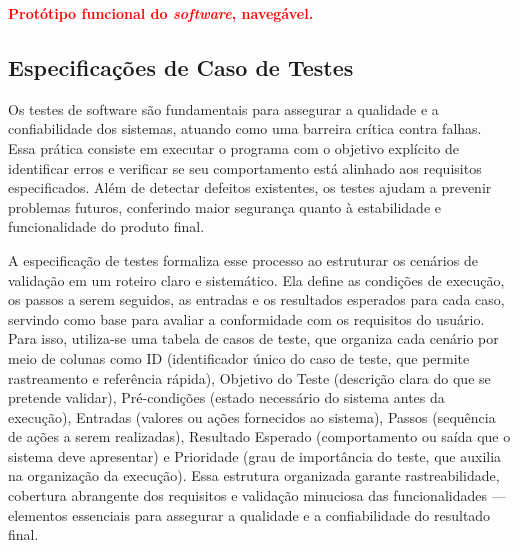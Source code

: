 \textcolor{red}{ \textbf{Protótipo funcional do \textit{software}, navegável.}}

\subsection{Especificações de Caso de Testes}

Os testes de software são fundamentais para assegurar a qualidade e a confiabilidade dos sistemas, atuando como uma barreira crítica contra falhas. Essa prática consiste em executar o programa com o objetivo explícito de identificar erros e verificar se seu comportamento está alinhado aos requisitos especificados. Além de detectar defeitos existentes, os testes ajudam a prevenir problemas futuros, conferindo maior segurança quanto à estabilidade e funcionalidade do produto final.

A especificação de testes formaliza esse processo ao estruturar os cenários de validação em um roteiro claro e sistemático. Ela define as condições de execução, os passos a serem seguidos, as entradas e os resultados esperados para cada caso, servindo como base para avaliar a conformidade com os requisitos do usuário. Para isso, utiliza-se uma tabela de casos de teste, que organiza cada cenário por meio de colunas como ID (identificador único do caso de teste, que permite rastreamento e referência rápida), Objetivo do Teste (descrição clara do que se pretende validar), Pré-condições (estado necessário do sistema antes da execução), Entradas (valores ou ações fornecidos ao sistema), Passos (sequência de ações a serem realizadas), Resultado Esperado (comportamento ou saída que o sistema deve apresentar) e Prioridade (grau de importância do teste, que auxilia na organização da execução). Essa estrutura organizada garante rastreabilidade, cobertura abrangente dos requisitos e validação minuciosa das funcionalidades — elementos essenciais para assegurar a qualidade e a confiabilidade do resultado final.

